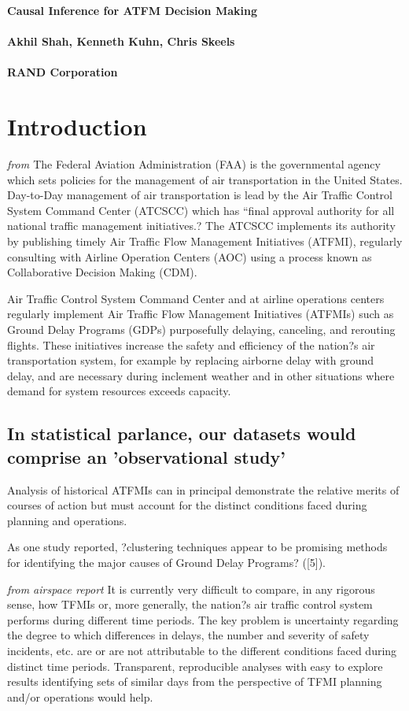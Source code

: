 \documentclass[11pt]{scrartcl}
\begin{document}
\noindent
{\bf \huge Causal Inference for ATFM Decision Making}\\
\ \\
{\bf \large Akhil Shah, Kenneth Kuhn, Chris Skeels}\\
\ \\
{\bf \normalsize RAND Corporation}\\
\section*{Introduction}

\emph{from \cite{projreport}}
The Federal Aviation Administration (FAA) is the governmental agency which sets policies for the management of air transportation in the United States.  Day-to-Day management of air transportation is lead by the Air Traffic Control System Command Center (ATCSCC) which has ``final approval authority for all national traffic management initiatives.?  The ATCSCC implements its authority by publishing timely Air Traffic Flow Management Initiatives (ATFMI), regularly consulting with Airline Operation Centers (AOC) using a process known as Collaborative Decision Making (CDM).   


Air Traffic Control System Command Center and at airline operations centers regularly implement Air Traffic Flow Management Initiatives (ATFMIs) such as Ground Delay Programs (GDPs) purposefully delaying, canceling, and rerouting flights. These initiatives increase the safety and efficiency of the nation?s air transportation system, for example by replacing airborne delay with ground delay, and are necessary during inclement weather and in other situations where demand for system resources exceeds capacity.

\subsection*{In statistical parlance, our datasets would comprise an 'observational study'}

Analysis of historical ATFMIs can in principal demonstrate the relative merits of courses of action but must account for the distinct conditions faced during planning and operations.

As one study reported, ?clustering techniques appear to be promising methods for identifying the major causes of Ground Delay Programs? ([5]).

\emph{from airspace report}
It is currently very difficult to compare, in any rigorous sense, how TFMIs or, more generally, the nation?s air traffic control system performs during different time periods. The key problem is uncertainty regarding the degree to which differences in delays, the number and severity of safety incidents, etc. are or are not attributable to the different conditions faced during distinct time periods. Transparent, reproducible analyses with easy to explore results identifying sets of similar days from the perspective of TFMI planning and/or operations would help.
\end{document}
